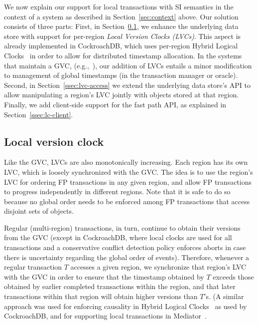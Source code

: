 

We now explain our support for local transactions with SI semantics in the
context of a system as described in Section~\ref{sec:context} above. 
Our solution consists of three parts: First, in Section~\ref{ssec:region-clock}, we enhance the
underlying data store with support for per-region \emph{Local Version Clocks (LVCs)}. 
This aspect is already implemented in CockroachDB, which uses 
per-region Hybrid Logical Clocks~\cite{Kulkarni2014LogicalPC} in order to allow for distributed timestamp allocation. 
In the systems that maintain a GVC, (e.g.,~\cite{Percolator2010,tephra,OmidICDE2014,omid-blog}), our 
addition of  LVCs 
entails a minor modification to management of global timestamps (in the transaction manager or oracle). 
Second, in Section~\ref{ssec:lvc-access}
we extend the underlying data store's API to allow manipulating 
a region's LVC jointly with objects stored at that region. 
Finally, we add client-side support for the fast path API, as explained in Section~\ref{ssec:lc-client}.

\subsection{Local version clock} \label{ssec:region-clock}


Like the GVC, LVCs are also monotonically increasing. Each region has its
own LVC, which is loosely synchronized with the GVC. The idea is to use the
region's LVC for ordering FP transactions in any given region, and allow
FP transactions to progress independently in different regions. Note that it
is safe to do so because no global order needs to be enforced among FP transactions
that access disjoint sets of objects.

Regular (multi-region) transactions, in turn, continue to obtain their versions from the
GVC (except in CockroachDB, where local clocks are used for all transactions and 
a conservative conflict detection policy enforces aborts in case there is uncertainty regarding
the global order of events). 
Therefore, whenever a regular transaction $T$ accesses a given region,
we synchronize that region's LVC with the GVC in order to ensure that
the timestamp obtained by $T$ exceeds those obtained by earlier completed
transactions within the region, and that later transactions within that region
will obtain higher versions than $T$'s. (A similar approach was used for enforcing 
causality in Hybrid Logical Clocks~\cite{Kulkarni2014LogicalPC} as used by CockroachDB, 
and for supporting local transactions in Mediator~\cite{mediator}.

